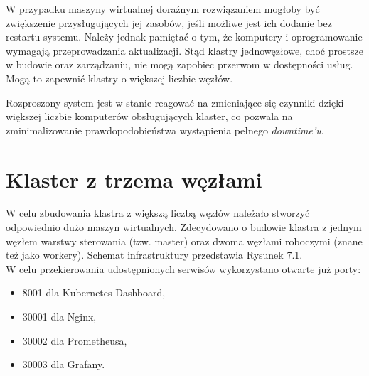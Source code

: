W przypadku maszyny wirtualnej doraźnym rozwiązaniem mogłoby być zwiększenie przysługujących jej zasobów, jeśli możliwe jest ich dodanie bez restartu systemu. Należy jednak pamiętać o tym, że komputery i oprogramowanie wymagają przeprowadzania aktualizacji. Stąd klastry jednowęzłowe, choć prostsze w budowie oraz zarządzaniu, nie mogą zapobiec przerwom w dostępności usług. Mogą to zapewnić klastry o większej liczbie węzłów.

Rozproszony system jest w stanie reagować na zmieniające się czynniki dzięki większej liczbie komputerów obsługujących klaster, co pozwala na zminimalizowanie prawdopodobieństwa wystąpienia pełnego \textit{downtime'u}. 


\chapter{Klaster z trzema węzłami}

W celu zbudowania klastra z większą liczbą węzłów należało stworzyć odpowiednio dużo maszyn wirtualnych. Zdecydowano o budowie klastra z jednym węzłem warstwy sterowania (tzw. master) oraz dwoma węzłami roboczymi (znane też jako workery). Schemat infrastruktury przedstawia Rysunek 7.1.\\

W celu przekierowania udostępnionych serwisów wykorzystano otwarte już porty:

\begin{itemize}
    \item 8001 dla Kubernetes Dashboard,
    \item 30001 dla Nginx,
    \item 30002 dla Prometheusa,
    \item 30003 dla Grafany.
\end{itemize}

